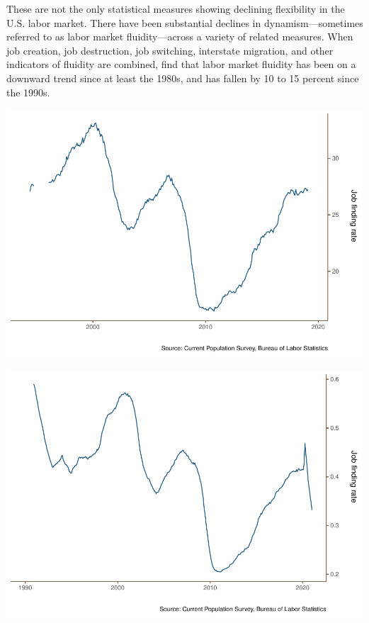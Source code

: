 \documentclass[
  11pt,
]{article}
\begin{document}
These are not the only statistical measures showing declining
flexibility in the U.S. labor market. There have been substantial
declines in dynamism---sometimes referred to as labor market
fluidity---across a variety of related measures. When job creation, job
destruction, job switching, interstate migration, and other indicators
of fluidity are combined, \cite{Molloy16} find that labor market
fluidity has been on a downward trend since at least the 1980s, and has
fallen by 10 to 15 percent since the 1990s.

\begin{center}\includegraphics{JOLTS_files/figure-latex/unnamed-chunk-10-1} \end{center}

\begin{center}\includegraphics{JOLTS_files/figure-latex/unnamed-chunk-11-1} \end{center}
\end{document}
